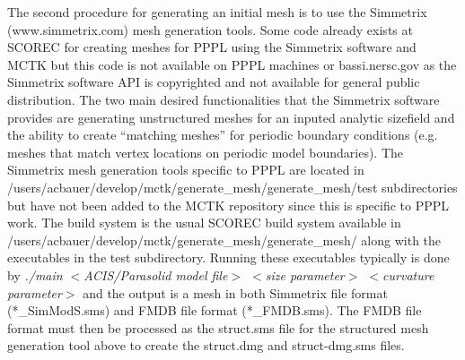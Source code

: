 The second procedure for generating an initial mesh is to use the Simmetrix (www.simmetrix.com)
mesh generation tools.  Some code already exists at SCOREC for creating meshes for PPPL 
using the Simmetrix
software and MCTK but this code is not available on PPPL machines or bassi.nersc.gov as the
Simmetrix software API is copyrighted and not available for general public distribution.  The two main
desired functionalities that the Simmetrix software provides are generating unstructured meshes
for an inputed analytic sizefield and the ability to create ``matching meshes'' for
periodic boundary conditions (e.g. meshes
that match vertex locations on periodic model boundaries).  The Simmetrix mesh generation tools
specific to PPPL are located in /users/acbauer/develop/mctk/generate\_mesh/generate\_mesh/test
subdirectories but have not been added to the MCTK repository since this is specific to PPPL work.
The build system is the usual SCOREC build system available in 
/users/acbauer/develop/mctk/generate\_mesh/generate\_mesh/
along with the executables in the test subdirectory.  Running these executables typically
is done by \textit{./main $<$ACIS/Parasolid model file$>$ $<$size parameter$>$ $<$curvature parameter$>$}
and the output is a mesh in both Simmetrix file format (*\_SimModS.sms) and
FMDB file format (*\_FMDB.sms).  The FMDB file format must then be processed as the struct.sms file
for the structured mesh generation tool above to create the struct.dmg and struct-dmg.sms files.

